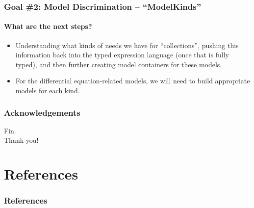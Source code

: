 \documentclass{beamer}
\begin{document}
\begin{frame}
    \frametitle{Goal \#2: Model Discrimination -- ``ModelKinds''}
    \framesubtitle{What are the next steps?}
    
    \begin{itemize}
        \item<2-> Understanding what kinds of needs we have for ``collections'', pushing this information back into the typed expression language (once that is fully typed), and then further creating model containers for these models.
        \item<3-> For the differential equation-related models, we will need to build appropriate models for each kind.
    \end{itemize}
\end{frame}


\begin{frame}
    \frametitle{Acknowledgements}
    
\end{frame}


\begin{frame}
    \center
    \huge{Fin.}\\
    \normalsize{Thank you!}
\end{frame}


\section{References}

\begin{frame}[allowframebreaks]
    \frametitle{References}

    
    
\end{frame}
\end{document}
